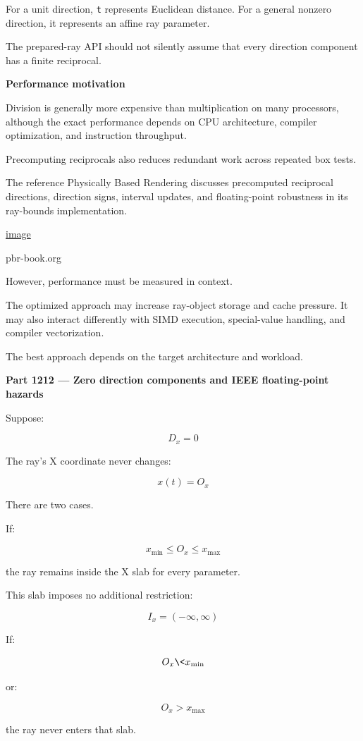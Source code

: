 For a unit direction, \texttt{t} represents Euclidean distance. For a general nonzero direction, it represents an affine ray parameter.

The prepared-ray API should not silently assume that every direction component has a finite reciprocal.

\textbf{Performance motivation}

Division is generally more expensive than multiplication on many processors, although the exact performance depends on CPU architecture, compiler optimization, and instruction throughput.

Precomputing reciprocals also reduces redundant work across repeated box tests.

The reference Physically Based Rendering discusses precomputed reciprocal directions, direction signs, interval updates, and floating-point robustness in its ray-bounds implementation. 

\href{https://www.google.com/s2/favicons?domain=https://www.pbr-book.org&sz=32}{image}

pbr-book.org

However, performance must be measured in context.

The optimized approach may increase ray-object storage and cache pressure. It may also interact differently with SIMD execution, special-value handling, and compiler vectorization.

The best approach depends on the target architecture and workload.

\textbf{Part 1212 --- Zero direction components and IEEE floating-point hazards}

Suppose:

\[
D_x=0
\]

The ray's X coordinate never changes:

\[
x(t)=O_x
\]

There are two cases.

If:

\[
x_{\min}\le O_x\le x_{\max}
\]

the ray remains inside the X slab for every parameter.

This slab imposes no additional restriction:

\[
I_x=(-\infty,\infty)
\]

If:

\[
O_x\<x_{\min}
\]

or:

\[
O_x>x_{\max}
\]

the ray never enters that slab.

